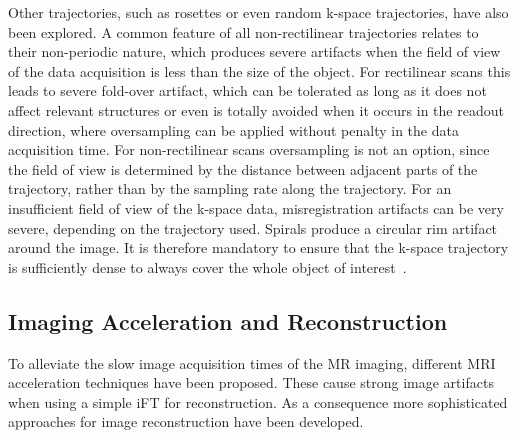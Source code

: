 Other trajectories, such as rosettes or even random k-space trajectories, have also been explored. A common feature of all non-rectilinear trajectories relates to their non-periodic nature, which produces severe artifacts when the field of view of the data acquisition is less than the size of the object. For rectilinear scans this leads to severe fold-over artifact, which can be tolerated as long as it does not affect relevant structures or even is totally avoided when it occurs in the readout direction, where oversampling can be applied without penalty in the data acquisition time. For non-rectilinear scans oversampling is not an option, since the field of view is determined by the distance between adjacent parts of the trajectory, rather than by the sampling rate along the trajectory.  For an insufficient field of view of the k-space data, misregistration artifacts can be very severe, depending on the trajectory used. Spirals produce a circular rim artifact around the image. It is therefore mandatory to ensure that the k-space trajectory is sufficiently dense to always cover the whole object of interest~\cite{SamplingStrategies}. 

\subsection{Imaging Acceleration and Reconstruction} \label{SubSec:ImagingAccelerationReconstruction}
To alleviate the slow image acquisition times of the MR imaging, different MRI acceleration techniques have been proposed. These cause strong image artifacts when using a simple iFT for reconstruction. As a consequence more sophisticated approaches for image reconstruction have been developed.

